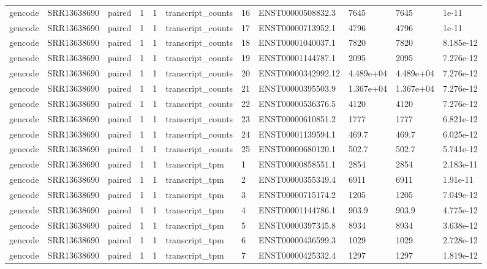 \begin{tabular}{lllllllllll}
gencode & SRR13638690 & paired & 1 & 1 & transcript\_counts & 16 & ENST00000508832.3 & 7645 & 7645 & 1e-11 \\
gencode & SRR13638690 & paired & 1 & 1 & transcript\_counts & 17 & ENST00000713952.1 & 4796 & 4796 & 1e-11 \\
gencode & SRR13638690 & paired & 1 & 1 & transcript\_counts & 18 & ENST00001040037.1 & 7820 & 7820 & 8.185e-12 \\
gencode & SRR13638690 & paired & 1 & 1 & transcript\_counts & 19 & ENST00001144787.1 & 2095 & 2095 & 7.276e-12 \\
gencode & SRR13638690 & paired & 1 & 1 & transcript\_counts & 20 & ENST00000342992.12 & 4.489e+04 & 4.489e+04 & 7.276e-12 \\
gencode & SRR13638690 & paired & 1 & 1 & transcript\_counts & 21 & ENST00000395503.9 & 1.367e+04 & 1.367e+04 & 7.276e-12 \\
gencode & SRR13638690 & paired & 1 & 1 & transcript\_counts & 22 & ENST00000536376.5 & 4120 & 4120 & 7.276e-12 \\
gencode & SRR13638690 & paired & 1 & 1 & transcript\_counts & 23 & ENST00000610851.2 & 1777 & 1777 & 6.821e-12 \\
gencode & SRR13638690 & paired & 1 & 1 & transcript\_counts & 24 & ENST00001139594.1 & 469.7 & 469.7 & 6.025e-12 \\
gencode & SRR13638690 & paired & 1 & 1 & transcript\_counts & 25 & ENST00000680120.1 & 502.7 & 502.7 & 5.741e-12 \\
gencode & SRR13638690 & paired & 1 & 1 & transcript\_tpm & 1 & ENST00000858551.1 & 2854 & 2854 & 2.183e-11 \\
gencode & SRR13638690 & paired & 1 & 1 & transcript\_tpm & 2 & ENST00000355349.4 & 6911 & 6911 & 1.91e-11 \\
gencode & SRR13638690 & paired & 1 & 1 & transcript\_tpm & 3 & ENST00000715174.2 & 1205 & 1205 & 7.049e-12 \\
gencode & SRR13638690 & paired & 1 & 1 & transcript\_tpm & 4 & ENST00001144786.1 & 903.9 & 903.9 & 4.775e-12 \\
gencode & SRR13638690 & paired & 1 & 1 & transcript\_tpm & 5 & ENST00000397345.8 & 8934 & 8934 & 3.638e-12 \\
gencode & SRR13638690 & paired & 1 & 1 & transcript\_tpm & 6 & ENST00000436599.3 & 1029 & 1029 & 2.728e-12 \\
gencode & SRR13638690 & paired & 1 & 1 & transcript\_tpm & 7 & ENST00000425332.4 & 1297 & 1297 & 1.819e-12 \\

\end{tabular}
